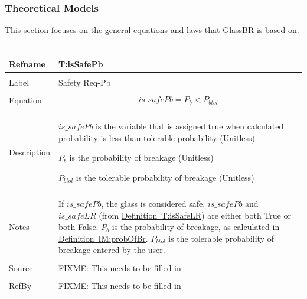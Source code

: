 \documentclass[12pt]{article}
\begin{document}
\subsubsection{Theoretical Models}
\label{Sec:TMs}
This section focuses on the general equations and laws that GlassBR is based on.
~\newline
\noindent \begin{minipage}{\textwidth}
\begin{tabular}{p{} p{}}
\toprule \textbf{Refname} & \textbf{T:isSafePb}
\label{T:isSafePb}
\\ \midrule \\
Label & Safety Req-Pb
\\ \midrule \\
Equation & \begin{dmath}
           is\_safePb={P_{b}}<{P_{btol}}
           \end{dmath}
\\ \midrule \\
Description & \begin{symbDescription}
              \item{$is\_safePb$ is the variable that is assigned true when calculated probability is less than tolerable probability (Unitless)}
              \item{${P_{b}}$ is the probability of breakage (Unitless)}
              \item{${P_{btol}}$ is the tolerable probability of breakage (Unitless)}
              \end{symbDescription}
\\ \midrule \\
Notes & If $is\_safePb$, the glass is considered safe. $is\_safePb$ and $is\_safeLR$ (from \hyperref[T:isSafeLR]{Definition~T:isSafeLR}) are either both True or both False. ${P_{b}}$ is the probability of breakage, as calculated in \hyperref[IM:probOfBr]{Definition~IM:probOfBr}. ${P_{btol}}$ is the tolerable probability of breakage entered by the user.
\\ \midrule \\
Source & FIXME: This needs to be filled in
\\ \midrule \\
RefBy & FIXME: This needs to be filled in
\\ \bottomrule \end{tabular}
\end{minipage}\\
~\newline
\end{document}
